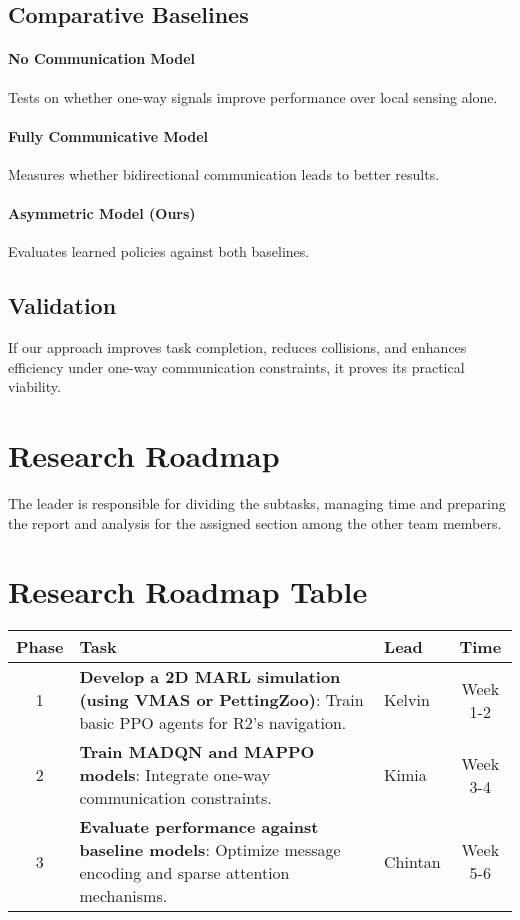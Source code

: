 \documentclass[a4paper,11pt]{article}
\begin{document}
\subsection{Comparative Baselines} 
\paragraph{No Communication Model} Tests on whether one-way signals improve performance over local sensing alone.

\paragraph{Fully Communicative Model} Measures whether bidirectional communication leads to better results.

\paragraph{Asymmetric Model (Ours)} Evaluates learned policies against both baselines.

\subsection{Validation} 
If our approach improves task completion, reduces collisions, and enhances efficiency under one-way communication constraints, it proves its practical viability.

\section{Research Roadmap} 
The leader is responsible for dividing the subtasks, managing time and preparing the report and analysis for the assigned section among the other team members. 

\section*{Research Roadmap Table}
\vspace{-3mm}
\begin{tabular}{|c|p{5cm}|p{3cm}|c|}
    \hline
    \textbf{Phase} & \textbf{Task} & \textbf{Lead} & \textbf{Time} \\ \hline
    1 & \textbf{Develop a 2D MARL simulation (using VMAS or PettingZoo)}: \newline Train basic PPO agents for R2’s navigation. & Kelvin & Week 1-2 \\ \hline
    2 & \textbf{Train MADQN and MAPPO models}: \newline Integrate one-way communication constraints. & Kimia & Week 3-4 \\ \hline
    3 & \textbf{Evaluate performance against baseline models}: \newline Optimize message encoding and sparse attention mechanisms. & Chintan & Week 5-6 \\ \hline
\end{tabular}
\end{document}
